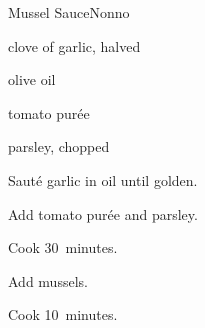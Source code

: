 \begin{recipe}{Mussel Sauce}{Nonno}{}

\begin{ingredients}
\item {}
\item clove of garlic, halved
\item olive oil
\item tomato pur\'ee
\item parsley, chopped
\end{ingredients}

\begin{directions}
\item Saut\'e garlic in oil until golden.
\item Add tomato pur\'ee and parsley.
\item Cook 30~minutes.
\item Add mussels.
\item Cook 10~minutes.
\end{directions}

\end{recipe}
